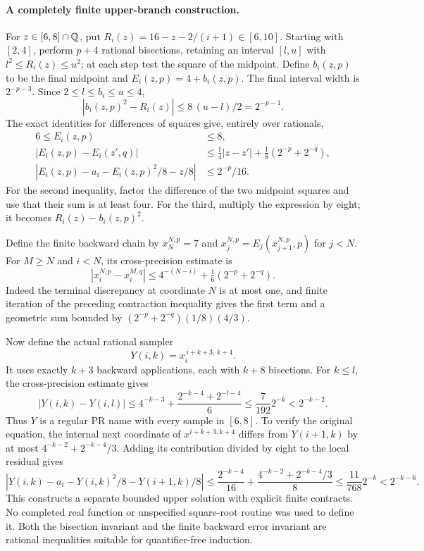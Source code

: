 \paragraph{A completely finite upper-branch construction.}
For $z\in[6,8]\cap\mathbb Q$, put
$R_i(z)=16-z-2/(i+1)\in[6,10]$.
Starting with $[2,4]$, perform $p+4$ rational bisections, retaining an
interval $[l,u]$ with $l^2\le R_i(z)\le u^2$; at each step test the
square of the midpoint.  Define $b_i(z,p)$ to be the final midpoint and
$E_i(z,p)=4+b_i(z,p)$.  The final interval width is $2^{-p-3}$.
Since $2\le l\le b_i\le u\le4$,
\[
 |b_i(z,p)^2-R_i(z)|\le 8\,(u-l)/2=2^{-p-1}.
\]
The exact identities for differences of squares give, entirely over
rationals,
\[
 \begin{split}
 6\le E_i(z,p)&\le8,\\
 |E_i(z,p)-E_i(z',q)|
 &\le\tfrac14|z-z'|+\tfrac18(2^{-p}+2^{-q}),\\
 \left|E_i(z,p)-a_i-E_i(z,p)^2/8-z/8\right|
 &\le2^{-p}/16.
 \end{split}
\]
For the second inequality, factor the difference of the two midpoint
squares and use that their sum is at least four.  For the third, multiply
the expression by eight; it becomes $R_i(z)-b_i(z,p)^2$.

Define the finite backward chain by
$x_N^{N,p}=7$ and $x_j^{N,p}=E_j(x_{j+1}^{N,p},p)$ for $j<N$.
For $M\ge N$ and $i<N$, its cross-precision estimate is
\[
 |x_i^{N,p}-x_i^{M,q}|
 \le4^{-(N-i)}+\tfrac16(2^{-p}+2^{-q}).
\]
Indeed the terminal discrepancy at coordinate $N$ is at most one, and
finite iteration of the preceding contraction inequality gives the first
term and a geometric sum bounded by
$(2^{-p}+2^{-q})(1/8)(4/3)$.

Now define the actual rational sampler
\[
 Y(i,k)=x_i^{\,i+k+3,\,k+4}.
\]
It uses exactly $k+3$ backward applications, each with $k+8$ bisections.
For $k\le l$, the cross-precision estimate gives
\[
 |Y(i,k)-Y(i,l)|
 \le4^{-k-3}+\frac{2^{-k-4}+2^{-l-4}}6
 \le\frac7{192}2^{-k}<2^{-k-2}.
\]
Thus $Y$ is a regular PR name with every sample in $[6,8]$.
To verify the original equation, the internal next coordinate of
$x^{i+k+3,k+4}$ differs from $Y(i+1,k)$ by at most
$4^{-k-2}+2^{-k-4}/3$.  Adding its contribution divided by eight
to the local residual gives
\[
 \left|Y(i,k)-a_i-Y(i,k)^2/8-Y(i+1,k)/8\right|
 \le\frac{2^{-k-4}}{16}
    +\frac{4^{-k-2}+2^{-k-4}/3}{8}
 \le\frac{11}{768}2^{-k}<2^{-k-6}.
\]
This constructs a separate bounded upper solution with explicit finite
contracts.  No completed real function or unspecified square-root routine
was used to define it.  Both the bisection invariant and the finite backward
error invariant are rational inequalities suitable for quantifier-free
induction.

